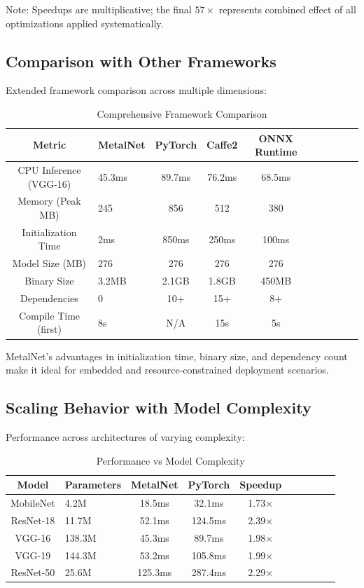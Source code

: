 \documentclass[12pt,oneside,a4paper]{report}
\begin{document}
Note: Speedups are multiplicative; the final $57\times$ represents combined effect of all optimizations applied systematically.

\subsection{Comparison with Other Frameworks}

Extended framework comparison across multiple dimensions:

\begin{table}[H]
\centering
\caption{Comprehensive Framework Comparison}
\begin{tabular}{|Sl|Sc|Sc|Sc|Sc|}
\hline
\textbf{Metric} & \textbf{MetalNet} & \textbf{PyTorch} & \textbf{Caffe2} & \textbf{ONNX Runtime} \\
\hline
CPU Inference (VGG-16) & 45.3ms & 89.7ms & 76.2ms & 68.5ms \\
\hline
Memory (Peak MB) & 245 & 856 & 512 & 380 \\
\hline
Initialization Time & 2ms & 850ms & 250ms & 100ms \\
\hline
Model Size (MB) & 276 & 276 & 276 & 276 \\
\hline
Binary Size & 3.2MB & 2.1GB & 1.8GB & 450MB \\
\hline
Dependencies & 0 & 10+ & 15+ & 8+ \\
\hline
Compile Time (first) & 8s & N/A & 15s & 5s \\
\hline
\end{tabular}
\end{table}

MetalNet's advantages in initialization time, binary size, and dependency count make it ideal for embedded and resource-constrained deployment scenarios.

\subsection{Scaling Behavior with Model Complexity}

Performance across architectures of varying complexity:

\begin{table}[H]
\centering
\caption{Performance vs Model Complexity}
\begin{tabular}{|Sl|Sc|Sc|Sc|Sc|}
\hline
\textbf{Model} & \textbf{Parameters} & \textbf{MetalNet} & \textbf{PyTorch} & \textbf{Speedup} \\
\hline
MobileNet & 4.2M & 18.5ms & 32.1ms & 1.73× \\
\hline
ResNet-18 & 11.7M & 52.1ms & 124.5ms & 2.39× \\
\hline
VGG-16 & 138.3M & 45.3ms & 89.7ms & 1.98× \\
\hline
VGG-19 & 144.3M & 53.2ms & 105.8ms & 1.99× \\
\hline
ResNet-50 & 25.6M & 125.3ms & 287.4ms & 2.29× \\
\hline
\end{tabular}
\end{table}
\end{document}
